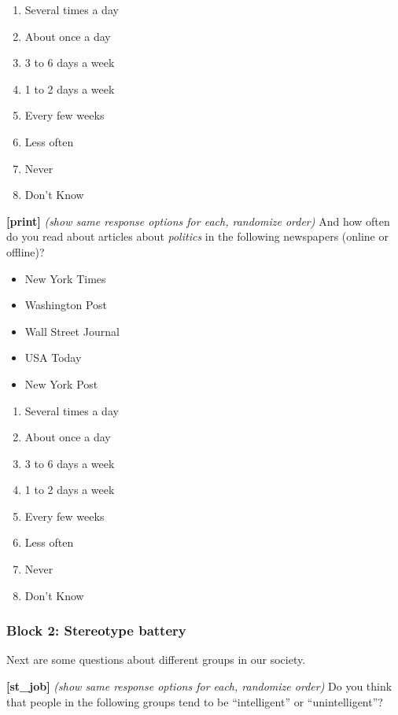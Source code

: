 \documentclass[
]{article}
\providecommand{\tightlist}{%
  \setlength{\itemsep}{0pt}\setlength{\parskip}{0pt}}
\begin{document}
\begin{enumerate}
\def\labelenumi{\arabic{enumi}.}
\tightlist
\item
  Several times a day
\item
  About once a day
\item
  3 to 6 days a week
\item
  1 to 2 days a week
\item
  Every few weeks
\item
  Less often
\item
  Never
\item
  Don't Know
\end{enumerate}

\textbf{{[}print{]}} \emph{(show same response options for each,
randomize order)} And how often do you read about articles about
\emph{politics} in the following newspapers (online or offline)?

\begin{itemize}
\tightlist
\item
  New York Times
\item
  Washington Post
\item
  Wall Street Journal
\item
  USA Today
\item
  New York Post
\end{itemize}

\begin{enumerate}
\def\labelenumi{\arabic{enumi}.}
\tightlist
\item
  Several times a day
\item
  About once a day
\item
  3 to 6 days a week
\item
  1 to 2 days a week
\item
  Every few weeks
\item
  Less often
\item
  Never
\item
  Don't Know
\end{enumerate}

\hypertarget{block-2-stereotype-battery}{%
\subsubsection{Block 2: Stereotype
battery}\label{block-2-stereotype-battery}}

Next are some questions about different groups in our society.

\textbf{{[}st\_job{]}} \emph{(show same response options for each,
randomize order)} Do you think that people in the following groups tend
to be ``intelligent'' or ``unintelligent''?
\end{document}

